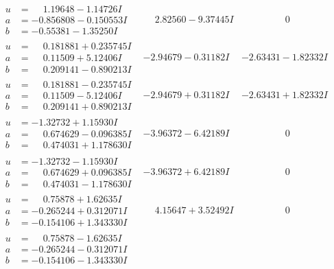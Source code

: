 \documentclass[1p]{elsarticle_modified}
\theoremstyle{definition}
\begin{document}
$$\begin{array}{c|c|c}
\begin{aligned}
u &= \phantom{-}1.19648 - 1.14726 I \\
a &= -0.856808 - 0.150553 I \\
b &= -0.55381 - 1.35250 I\end{aligned}
 & \phantom{-}2.82560 - 9.37445 I & \phantom{-0.000000 } 0 \\ \hline\begin{aligned}
u &= \phantom{-}0.181881 + 0.235745 I \\
a &= \phantom{-}0.11509 + 5.12406 I \\
b &= \phantom{-}0.209141 - 0.890213 I\end{aligned}
 & -2.94679 - 0.31182 I & -2.63431 - 1.82332 I \\ \hline\begin{aligned}
u &= \phantom{-}0.181881 - 0.235745 I \\
a &= \phantom{-}0.11509 - 5.12406 I \\
b &= \phantom{-}0.209141 + 0.890213 I\end{aligned}
 & -2.94679 + 0.31182 I & -2.63431 + 1.82332 I \\ \hline\begin{aligned}
u &= -1.32732 + 1.15930 I \\
a &= \phantom{-}0.674629 - 0.096385 I \\
b &= \phantom{-}0.474031 + 1.178630 I\end{aligned}
 & -3.96372 - 6.42189 I & \phantom{-0.000000 } 0 \\ \hline\begin{aligned}
u &= -1.32732 - 1.15930 I \\
a &= \phantom{-}0.674629 + 0.096385 I \\
b &= \phantom{-}0.474031 - 1.178630 I\end{aligned}
 & -3.96372 + 6.42189 I & \phantom{-0.000000 } 0 \\ \hline\begin{aligned}
u &= \phantom{-}0.75878 + 1.62635 I \\
a &= -0.265244 + 0.312071 I \\
b &= -0.154106 + 1.343330 I\end{aligned}
 & \phantom{-}4.15647 + 3.52492 I & \phantom{-0.000000 } 0 \\ \hline\begin{aligned}
u &= \phantom{-}0.75878 - 1.62635 I \\
a &= -0.265244 - 0.312071 I \\
b &= -0.154106 - 1.343330 I\end{aligned}

\end{array}$$
\end{document}
